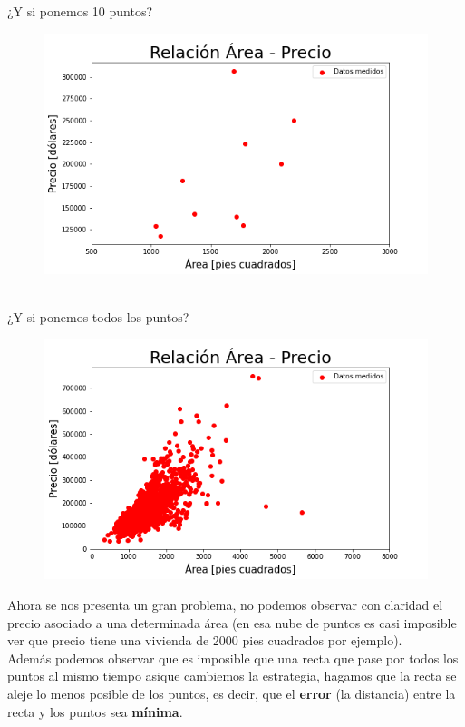 \documentclass{article}
\begin{document}
\newpage
¿Y si ponemos 10 puntos?\\
\begin{figure}[h!]
\includegraphics[scale=0.5]{Imagenes/10_puntos.png}
\centering
\end{figure}
\\
¿Y si ponemos todos los puntos?\\
\begin{figure}[h]
\includegraphics[scale=0.5]{Imagenes/todos_los_puntos.png}
\centering
\end{figure}
\newpage
Ahora se nos presenta un gran problema, no podemos observar con claridad el precio asociado a una determinada área (en esa nube de puntos es casi imposible ver que precio tiene una vivienda de 2000 pies cuadrados por ejemplo).\\
Además podemos observar que es imposible que una recta que pase por todos los puntos al mismo tiempo asique cambiemos la estrategia, hagamos que la recta se aleje lo menos posible de los puntos, es decir, que el \textbf{error} (la distancia) entre la recta y los puntos sea \textbf{mínima}.\\
\end{document}
